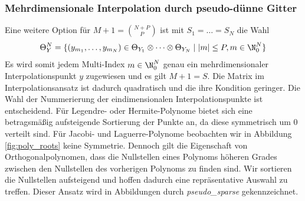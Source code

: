\subsubsection*{Mehrdimensionale Interpolation durch pseudo-dünne Gitter}
Eine weitere Option für $M+1=\binom{N+P}{P}$ ist mit $S_1=\dots=S_N$ die Wahl
\[\Theta_Y^N=\lbrace (y_{m_1},\dots,y_{m_N})\in \Theta_{Y_1}\otimes \dots \otimes \Theta_{Y_N} \mid |m|\le P,m\in\N_0^N \rbrace \]
Es wird somit jedem Multi-Index $m\in\N_0^N$ genau ein mehrdimensionaler Interpolationspunkt $y$ zugewiesen und es gilt $M+1=S$. Die Matrix im Interpolationsansatz ist dadurch quadratisch und die ihre Kondition geringer. Die Wahl der Nummerierung der eindimensionalen Interpolationspunkte ist entscheidend. Für Legendre- oder Hermite-Polynome bietet sich eine betragsmäßig aufsteigende Sortierung der Punkte an, da diese symmetrisch um $0$ verteilt sind. Für Jacobi- und Laguerre-Polynome beobachten wir in Abbildung \ref{fig:poly_roots} keine Symmetrie. Dennoch gilt die Eigenschaft von Orthogonalpolynomen, dass die Nullstellen eines Polynoms höheren Grades zwischen den Nullstellen des vorherigen Polynoms zu finden sind. Wir sortieren die Nullstellen aufsteigend und hoffen dadurch eine repräsentative Auswahl zu treffen. Dieser Ansatz wird in Abbildungen durch \textit{pseudo\_sparse} gekennzeichnet.
